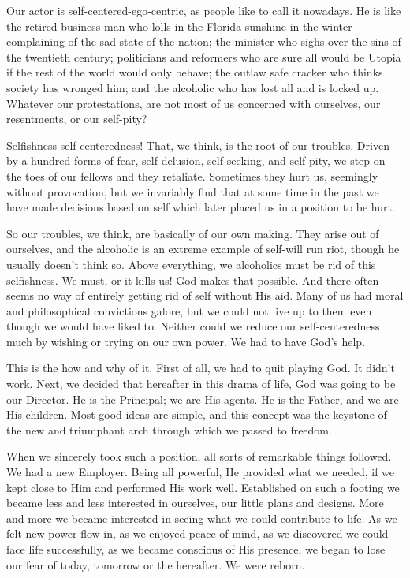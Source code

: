 \begin{biblechapter}
Our actor is self-centered-ego-centric, as people like to call it nowadays.  He is like the retired business man who lolls in the Florida sunshine in the winter complaining of the sad state of the nation; the minister who sighs over the sins of the twentieth century; politicians and reformers who are sure all would be Utopia if the rest of the world would only behave; the outlaw safe cracker who thinks society has wronged him; and the alcoholic who has lost all and is locked up.  Whatever our protestations, are not most of us concerned with ourselves, our resentments, or our self-pity?

Selfishness-self-centeredness!  That, we think, is the root of our troubles.  Driven by a hundred forms of fear, self-delusion, self-seeking, and self-pity, we step on the toes of our fellows and they retaliate.  Sometimes they hurt us, seemingly without provocation, but we invariably find that at some time in the past we have made decisions based on self which later placed us in a position to be hurt.

So our troubles, we think, are basically of our own making.  They arise out of ourselves, and the alcoholic is an extreme example of self-will run riot, though he usually doesn't think so.  Above everything, we alcoholics must be rid of this selfishness.  We must, or it kills us!  God makes that possible.  And there often seems no way of entirely getting rid of self without His aid.  Many of us had moral and philosophical convictions galore, but we could not live up to them even though we would have liked to.  Neither could we reduce our self-centeredness much by wishing or trying on our own power.  We had to have God's help.

This is the how and why of it.  First of all, we had to quit playing God.  It didn't work.  Next, we decided that hereafter in this drama of life, God was going to be our Director.  He is the Principal; we are His agents.  He is the Father, and we are His children.  Most good ideas are simple, and this concept was the keystone of the new and triumphant arch through which we passed to freedom.

When we sincerely took such a position, all sorts of remarkable things followed.  We had a new Employer.  Being all powerful, He provided what we needed, if we kept close to Him and performed His work well.  Established on such a footing we became less and less interested in ourselves, our little plans and designs.  More and more we became interested in seeing what we could contribute to life.  As we felt new power flow in, as we enjoyed peace of mind, as we discovered we could face life successfully, as we became conscious of His presence, we began to lose our fear of today, tomorrow or the hereafter.  We were reborn.


\end{biblechapter}

